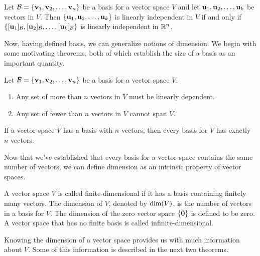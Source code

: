 \documentclass[../m073main.tex]{subfiles}
\begin{document}
\begin{theorem}
	Let $\mathcal{B} = \{\mathbf{v}_1, \mathbf{v}_2, \ldots, \mathbf{v}_n\}$ be a basis for a vector space $V$ and let $\mathbf{u}_1, \mathbf{u}_2, \ldots, \mathbf{u}_k$ be vectors in $V$.
	Then $\{\mathbf{u}_1, \mathbf{u}_2, \ldots, \mathbf{u}_k	\}$ is linearly independent in $V$ if and only if $\{[\mathbf{u}_1]_{\mathcal{B}}, [\mathbf{u}_2]_{\mathcal{B}}, \ldots, [\mathbf{u}_k]_{\mathcal{B}}\}$ is linearly independent in $\mathbb{R}^n$.
\end{theorem}

Now, having defined basis, we can generalize notions of dimension.
We begin with some motivating theorems, both of which establish the size of a basis as an important quantity.

\begin{theorem}
	Let $\mathcal{B} = \{\mathbf{v}_1, \mathbf{v}_2, \ldots, \mathbf{v}_n\}$ be a basis for a vector space $V$.
	\begin{enumerate}[label=(\alph*)]
		\item Any set of more than $n$ vectors in $V$ must be linearly dependent.
		\item Any set of fewer than $n$ vectors in $V$ cannot span $V$.
	\end{enumerate}
\end{theorem}

\begin{theorem}
	If a vector space $V$ has a basis with $n$ vectors, then every basis for $V$ has exactly $n$ vectors.
\end{theorem}

Now that we've established that every basis for a vector space contains the same number of vectors, we can define dimension as an intrinsic property of vector spaces.

\begin{definition}[Dimension]
	A vector space $V$ is called finite-dimensional if it has a basis containing finitely many vectors.
	The dimension of $V$, denoted by $\textrm{dim}(V)$, is the number of vectors in a basis for $V$.
	The dimension of the zero vector space $\{\mathbf{0}\}$ is defined to be zero.
	A vector space that has no finite basis is called infinite-dimensional.
\end{definition}

Knowing the dimension of a vector space provides us with much information about $V$.
Some of this information is described in the next two theorems.
\end{document}

